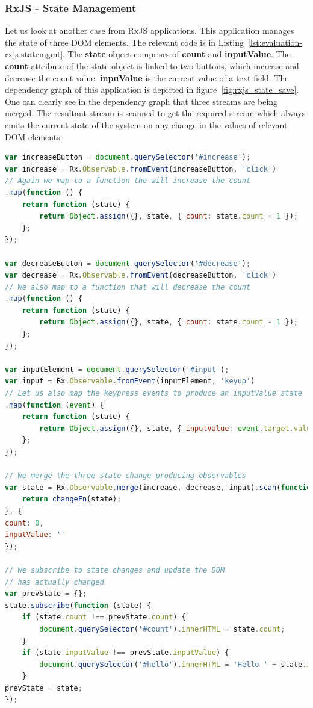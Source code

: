 \subsubsection{RxJS - State Management}

Let us look at another case from RxJS applications. This application manages the state of three DOM elements. The relevant code is in Listing~\ref{lst:evaluation-rxjs-statemgmt}.  The \textbf{state} object comprises of \textbf{count} and \textbf{inputValue}. The \textbf{count} attribute of the state object is linked to two buttons, which increase and decrease the count value. \textbf{inpuValue} is the current value of a text field.  The dependency graph of this application is depicted in figure~\ref{fig:rxjs_state_save}. One can clearly see in the dependency graph that three streams are being merged. The resultant stream is scanned to get the required stream which always emits the current state of the system on any change in the values of relevant DOM elements.

\begin{lstlisting}[language=JavaScript, caption=RxJS - State Management, label={lst:evaluation-rxjs-statemgmt}]
var increaseButton = document.querySelector('#increase');
var increase = Rx.Observable.fromEvent(increaseButton, 'click')
// Again we map to a function the will increase the count
.map(function () {
	return function (state) {
		return Object.assign({}, state, { count: state.count + 1 });
	};
});

var decreaseButton = document.querySelector('#decrease');
var decrease = Rx.Observable.fromEvent(decreaseButton, 'click')
// We also map to a function that will decrease the count
.map(function () {
	return function (state) {
		return Object.assign({}, state, { count: state.count - 1 });
	};
});

var inputElement = document.querySelector('#input');
var input = Rx.Observable.fromEvent(inputElement, 'keyup')
// Let us also map the keypress events to produce an inputValue state
.map(function (event) {
	return function (state) {
		return Object.assign({}, state, { inputValue: event.target.value });
	};
});

// We merge the three state change producing observables
var state = Rx.Observable.merge(increase, decrease, input).scan(function (state, changeFn) {
	return changeFn(state);
}, {
count: 0,
inputValue: ''
});

// We subscribe to state changes and update the DOM
// has actually changed
var prevState = {};
state.subscribe(function (state) {
	if (state.count !== prevState.count) {
		document.querySelector('#count').innerHTML = state.count;
	}
	if (state.inputValue !== prevState.inputValue) {
		document.querySelector('#hello').innerHTML = 'Hello ' + state.inputValue;
	}
prevState = state;
});
\end{lstlisting}



